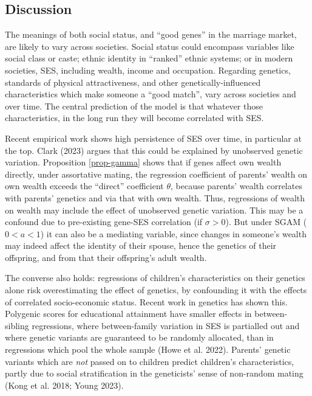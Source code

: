 \documentclass[
  12pt,
]{article}
\theoremstyle{definition}
\theoremstyle{definition}
\theoremstyle{definition}
\theoremstyle{definition}
\theoremstyle{remark}
\begin{document}
\subsection{Discussion}\label{discussion}

The meanings of both social status, and ``good genes'' in the
marriage market, are likely to vary across societies. Social status could
encompass variables like social class or caste; ethnic identity in
``ranked'' ethnic systems; or in modern societies, SES, including wealth, income
and occupation. Regarding genetics, standards of physical attractiveness, and
other genetically-influenced characteristics which make someone a ``good match'',
vary across societies and over time. The central prediction of the model is that
whatever those characteristics, in the long run they will become correlated with
SES.

Recent empirical work shows high persistence of SES over time, in particular at
the top. Clark (2023) argues that this could be explained by unobserved
genetic variation.
Proposition \ref{prop-gamma} shows that if genes affect own wealth directly,
under assortative mating, the regression coefficient of parents' wealth on own
wealth exceeds the ``direct'' coefficient \(\theta\), because parents' wealth
correlates with parents' genetics and via that with own wealth. Thus,
regressions of wealth on wealth may include the effect of unobserved genetic
variation. This may be a confound due to pre-existing gene-SES correlation (if
\(\sigma > 0\)). But under SGAM (\(0 < a < 1\)) it can also be a mediating
variable, since changes in someone's wealth may indeed affect the identity of
their spouse, hence the genetics of their offspring, and from that their
offspring's adult wealth.

The converse also holds: regressions of children's characteristics on their
genetics alone risk overestimating the effect of genetics, by confounding it
with the effects of correlated socio-economic status. Recent work in genetics
has shown this. Polygenic scores for educational attainment have smaller effects
in between-sibling regressions, where between-family variation in SES is
partialled out and where genetic variants are guaranteed to be randomly
allocated, than in regressions which pool the whole sample ({Howe et al.} 2022).
Parents' genetic variants which are \emph{not} passed on to children predict
children's characteristics, partly due to social stratification in the geneticists'
sense of non-random mating ({Kong et al.} 2018; Young 2023).
\end{document}

